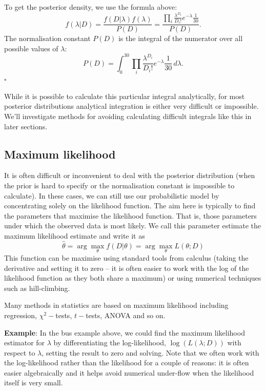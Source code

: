 \documentclass[11pt]{article}
\newcommand{\sqend}{\hfill $\square$}
\begin{document}
To get the posterior density, we use the formula above: 
\[ f(\lambda | D) = \frac{f(D|\lambda)f(\lambda)}{P(D)} = \frac{ \prod_{i}  \frac{\lambda^{D_i}}{D_i!} e^{-\lambda} \frac{1}{30}}{P(D)}. \]
The normalisation constant $P(D)$ is the integral of the numerator over all possible values of $\lambda$:
\[
P(D) = \int_{0}^{30} \prod_{i}  \frac{\lambda^{D_i}}{D_i!} e^{-\lambda} \frac{1}{30} \, d \lambda.
\] \sqend

While it is possible to calculate this particular integral analytically, for most posterior distributions analytical integration is either very difficult or impossible.  We'll investigate methods for avoiding calculating difficult integrals like this in later sections.



\subsection{Maximum likelihood}

It is often difficult or inconvenient to deal with the posterior distribution (when the prior is hard to specify or the normalisation constant is impossible to calculate).   In these cases, we can still use our probabilistic model by concentrating solely on the likelihood function.  The aim here is typically to find the parameters that maximise the likelihood function.  That is, those parameters under which the observed data is most likely.  We call this parameter estimate the maximum likelihood estimate and write it as 
\[ \hat \theta  = \arg\max _\theta f(D | \theta) = \arg \max_\theta L( \theta;D)  \]
This function can be maximise using standard tools from calculus (taking the derivative and setting it to zero -- it is often easier to work with the log of the likelihood function as they both share a maximum) or using numerical techniques such as hill-climbing.  

Many methods in statistics are based on maximum likelihood including regression, $\chi^2-$tests, $t-$tests, ANOVA and so on.  

{\bf Example}: In the bus example above, we could find the maximum likelihood estimator for $\lambda$ by differentiating the log-likelihood, $\log(L( \lambda;D))$ with respect to $\lambda$, setting the result to zero and solving.  Note that we often work with  the log-likelihood rather than the likelihood for a couple of reasons: it is often easier algebraically and it helps avoid numerical under-flow  when the likelihood itself is very small.
\end{document}
